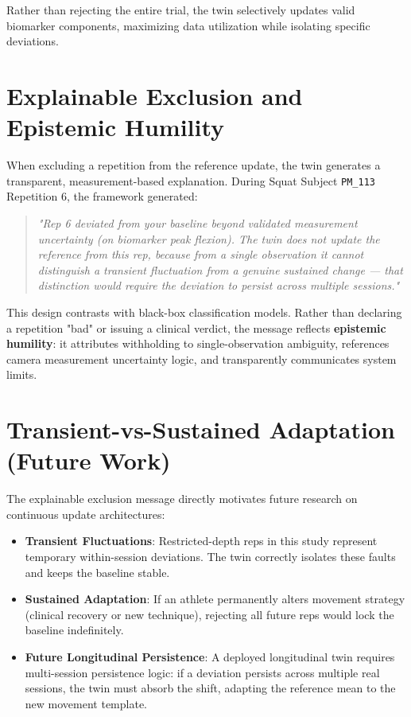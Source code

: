 Rather than rejecting the entire trial, the twin selectively updates valid biomarker components, maximizing data utilization while isolating specific deviations.



\section{Explainable Exclusion and Epistemic Humility}
\label{sec:11-5-explainable-exclusion-and-epistemic-humility}


When excluding a repetition from the reference update, the twin generates a transparent, measurement-based explanation. During Squat Subject \texttt{PM\_113} Repetition 6, the framework generated:

\begin{quote}
\textit{"Rep 6 deviated from your baseline beyond validated measurement uncertainty (on biomarker peak flexion). The twin does not update the reference from this rep, because from a single observation it cannot distinguish a transient fluctuation from a genuine sustained change — that distinction would require the deviation to persist across multiple sessions."}
\end{quote}

This design contrasts with black-box classification models. Rather than declaring a repetition "bad" or issuing a clinical verdict, the message reflects \textbf{epistemic humility}: it attributes withholding to single-observation ambiguity, references camera measurement uncertainty logic, and transparently communicates system limits.



\section{Transient-vs-Sustained Adaptation (Future Work)}
\label{sec:11-6-transient-vs-sustained-adaptation-future-work}


The explainable exclusion message directly motivates future research on continuous update architectures:
\begin{itemize}
  \item \textbf{Transient Fluctuations}: Restricted-depth reps in this study represent temporary within-session deviations. The twin correctly isolates these faults and keeps the baseline stable.
  \item \textbf{Sustained Adaptation}: If an athlete permanently alters movement strategy (clinical recovery or new technique), rejecting all future reps would lock the baseline indefinitely.
  \item \textbf{Future Longitudinal Persistence}: A deployed longitudinal twin requires multi-session persistence logic: if a deviation persists across multiple real sessions, the twin must absorb the shift, adapting the reference mean to the new movement template.
\end{itemize}



